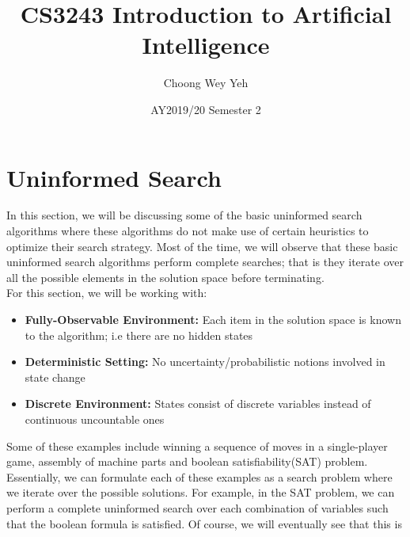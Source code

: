 \documentclass[12pt]{article}
\title{CS3243 Introduction to Artificial Intelligence}
\date{AY2019/20 Semester 2}
\author{Choong Wey Yeh}
\begin{document}
\maketitle

\section{Uninformed Search}

In this section, we will be discussing some of the basic uninformed search algorithms where these algorithms do not make use of certain heuristics to optimize their search strategy. Most of the time, we will observe that these basic uninformed search algorithms perform complete searches; that is they iterate over all the possible elements in the solution space before terminating.\\

For this section, we will be working with:
\begin{itemize}
\item \textbf{Fully-Observable Environment:} Each item in the solution space is known to the algorithm; i.e there are no hidden states
\item \textbf{Deterministic Setting:} No uncertainty/probabilistic notions involved in state change
\item \textbf{Discrete Environment:} States consist of discrete variables instead of continuous uncountable ones
\end{itemize}

Some of these examples include winning a sequence of moves in a single-player game, assembly of machine parts and boolean satisfiability(SAT) problem. Essentially, we can formulate each of these examples as a search problem where we iterate over the possible solutions. For example, in the SAT problem, we can perform a complete uninformed search over each combination of variables such that the boolean formula is satisfied. Of course, we will eventually see that this is not an efficient(nor practical) way to attain a solution for various problems.

\subsection{Problem Formulation}

Formally, we can define the basic elements of a problem definition using \textbf{states}, which are the current configurations for the problem(e.g the variable values for a SAT problem), and \textbf{actions} which causes a transition of one state to another via changing configurations(setting a boolean variable from true to false). When considering the configurations for state and actions, most of the factors are unnecessary and may be \textbf{abstracted out}. For the route planning problem in particular, we are concerned with how route the driver takes to get to a location, but \textit{not exactly how he drives there}, such as which lane or which car he uses. In this case, such information may be left out of the problem definition.\\
\end{document}
